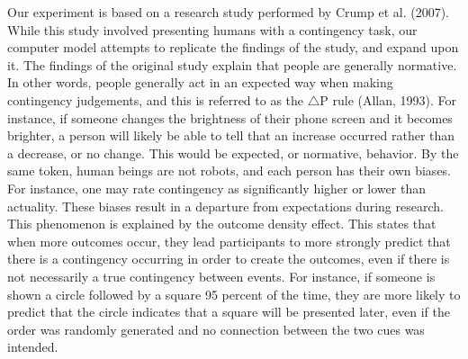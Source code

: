 \documentclass[
  english,
  man,floatsintext]{apa6}
\begin{document}
Our experiment is based on a research study performed by Crump et al. (2007). While this study involved presenting humans with a contingency task, our computer model attempts to replicate the findings of the study, and expand upon it. The findings of the original study explain that people are generally normative. In other words, people generally act in an expected way when making contingency judgements, and this is referred to as the \(\triangle\)P rule (Allan, 1993). For instance, if someone changes the brightness of their phone screen and it becomes brighter, a person will likely be able to tell that an increase occurred rather than a decrease, or no change. This would be expected, or normative, behavior. By the same token, human beings are not robots, and each person has their own biases. For instance, one may rate contingency as significantly higher or lower than actuality. These biases result in a departure from expectations during research. This phenomenon is explained by the outcome density effect. This states that when more outcomes occur, they lead participants to more strongly predict that there is a contingency occurring in order to create the outcomes, even if there is not necessarily a true contingency between events. For instance, if someone is shown a circle followed by a square 95 percent of the time, they are more likely to predict that the circle indicates that a square will be presented later, even if the order was randomly generated and no connection between the two cues was intended.
\end{document}
